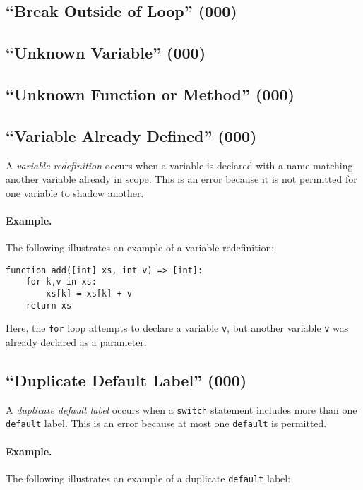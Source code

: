 \subsection{``Break Outside of Loop'' (000)}

\subsection{``Unknown Variable'' (000)}

\subsection{``Unknown Function or Method'' (000)}

\subsection{``Variable Already Defined'' (000)}

A {\em variable redefinition} occurs when a variable is declared with a name matching another variable already in scope.  This is an error because it is not permitted for one variable to shadow another.

\paragraph{Example.}  The following illustrates an example of a variable redefinition:

\begin{lstlisting}
function add([int] xs, int v) => [int]:
    for k,v in xs:
        xs[k] = xs[k] + v
    return xs
\end{lstlisting}

Here, the \lstinline{for} loop attempts to declare a variable \lstinline{v}, but another variable \lstinline{v} was already declared as a parameter.

\subsection{``Duplicate Default Label'' (000)}
A {\em duplicate default label} occurs when a \lstinline{switch} statement includes more than one \lstinline{default} label.  This is an error because at most one \lstinline{default} is permitted.

\paragraph{Example.}  The following illustrates an example of a duplicate \lstinline{default} label:

